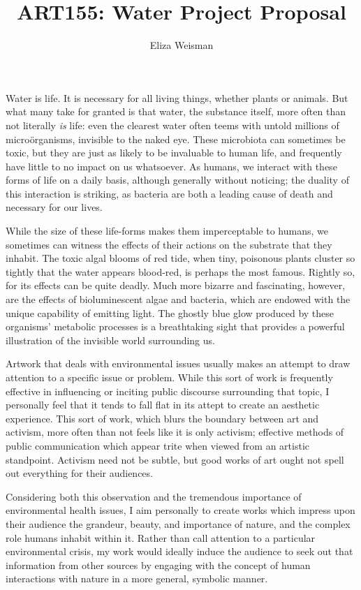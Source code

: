 \documentclass[a4paper,12pt]{article}
\title{ART155: Water Project Proposal}
\author{Eliza Weisman}
\begin{document}
\maketitle
\doublespacing

Water is life. It is necessary for all living things, whether plants or animals. But what many take for granted is that water, the substance itself, more often than not literally \textit{is} life: even the clearest water often teems with untold millions of micro{\"o}rganisms, invisible to the naked eye. These microbiota can sometimes be toxic, but they are just as likely to be invaluable to human life, and frequently have little to no impact on us whatsoever. As humans, we interact with these forms of life on a daily basis, although generally without noticing; the duality of this interaction is striking, as bacteria are both a leading cause of death and necessary for our lives.

While the size of these life-forms makes them imperceptable to humans, we sometimes can witness the effects of their actions on the substrate that they inhabit. The toxic algal blooms of red tide, when tiny, poisonous plants cluster so tightly that the water appears blood-red, is perhaps the most famous. Rightly so, for its effects can be quite deadly. Much more bizarre and fascinating, however, are the effects of bioluminescent algae and bacteria, which are endowed with the unique capability of emitting light. The ghostly blue glow produced by these organisms' metabolic processes is a breathtaking sight that provides a powerful illustration of the invisible world surrounding us.

Artwork that deals with environmental issues usually makes an attempt to draw attention to a specific issue or problem. While this sort of work is frequently effective in influencing or inciting public discourse surrounding that topic, I personally feel that it tends to fall flat in its attept to create an aesthetic experience. This sort of work, which blurs the boundary between art and activism, more often than not feels like it is only activism; effective methods of public communication which appear trite when viewed from an artistic standpoint. Activism need not be subtle, but good works of art ought not spell out everything for their audiences.

Considering both this observation and the tremendous importance of environmental health issues, I aim personally to create works which impress upon their audience the grandeur, beauty, and importance of nature, and the complex role humans inhabit within it. Rather than call attention to a particular environmental crisis, my work would ideally induce the audience to seek out that information from other sources by engaging with the concept of human interactions with nature in a more general, symbolic manner.
\end{document}
